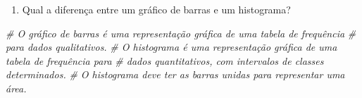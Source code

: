 \documentclass[]{article}
\newenvironment{Shaded}{\begin{snugshade}}{\end{snugshade}}
\newcommand{\CommentTok}[1]{\textcolor[rgb]{0.56,0.35,0.01}{\textit{#1}}}
\providecommand{\tightlist}{%
  \setlength{\itemsep}{0pt}\setlength{\parskip}{0pt}}
\begin{document}
\begin{enumerate}
\def\labelenumi{\arabic{enumi}.}
\setcounter{enumi}{7}
\tightlist
\item
  Qual a diferença entre um gráfico de barras e um histograma?
\end{enumerate}

\begin{Shaded}
\begin{Highlighting}[]
\CommentTok{# O gráfico de barras é uma representação gráfica de uma tabela de frequência}
\CommentTok{# para dados qualitativos.}
\CommentTok{# O histograma é uma representação gráfica de uma tabela de frequência para}
\CommentTok{# dados quantitativos, com intervalos de classes determinados.}
\CommentTok{# O histograma deve ter as barras unidas para representar uma área. }
\end{Highlighting}
\end{Shaded}
\end{document}
